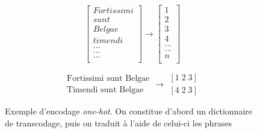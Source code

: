 
\begin{figure}[h]
    \centering
    \noindent\begin{minipage}{.32\linewidth}
        \begin{equation*}
            \begin{bmatrix}
            Fortissimi \\ 
            sunt \\ 
            Belgae \\ 
            timendi \\ 
            ... \\ 
            ... \\ 
            ... \\ 
            \end{bmatrix}
            \rightarrow \begin{bmatrix}
            1 \\ 
            2 \\ 
            3 \\ 
            4 \\ 
            ... \\ 
            ... \\ 
            n \\ 
            \end{bmatrix}
        \end{equation*}
    \end{minipage}%
    \begin{minipage}{.32\linewidth}
        \begin{equation*}
            \begin{matrix}
            \textrm{Fortissimi sunt Belgae}\\ 
            \textrm{Timendi sunt Belgae}
            \end{matrix}
            \rightarrow
            \begin{matrix}
            \left [ 1\;  2\;  3 \right ]\\ 
            \left [ 4\;  2\;  3 \right ]
            \end{matrix}
        \end{equation*}
    \end{minipage}
    \caption{Exemple d'encodage\textit{ one-hot}. On constitue d'abord un dictionnaire de transcodage, puis on traduit à l'aide de celui-ci les phrases}
    \label{deep-learning:one-hot-encoding}
\end{figure}